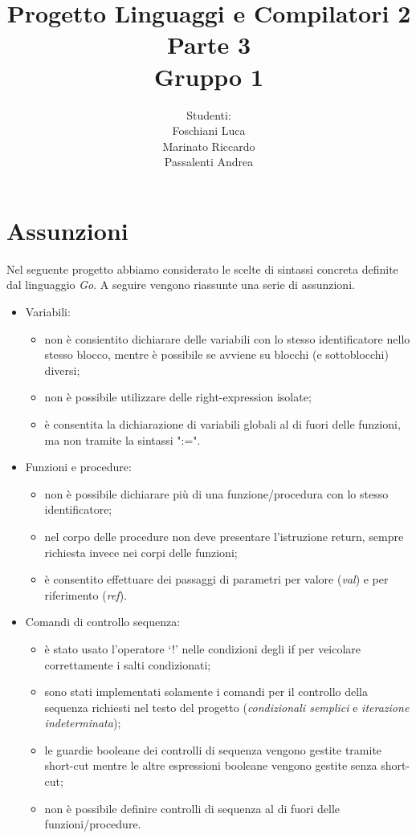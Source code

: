 \documentclass[12pt]{article}
\begin{document}
\title{\noindent \Huge Progetto Linguaggi e Compilatori 2\\ Parte 3 \\ Gruppo 1}
\date{}
\author{Studenti: \\Foschiani Luca\\ Marinato Riccardo \\Passalenti Andrea}

\maketitle
\newpage

\section{Assunzioni}
Nel seguente progetto abbiamo considerato le scelte di sintassi concreta definite dal linguaggio \textit{Go}.
A seguire vengono riassunte una serie di assunzioni.

\begin{itemize}
\item Variabili:
	\begin{itemize}
		\item non è consientito dichiarare delle variabili con lo stesso identificatore nello stesso blocco, mentre è possibile se avviene su blocchi (e sottoblocchi) diversi;
		\item non è possibile utilizzare delle right-expression isolate;
		\item è consentita la dichiarazione di variabili globali al di fuori delle funzioni, ma non tramite la sintassi ":=".
	\end{itemize}
\item Funzioni e procedure:
	\begin{itemize}
		\item non è possibile dichiarare più di una funzione/procedura con lo stesso identificatore;
		\item nel corpo delle procedure non deve presentare l'istruzione return, sempre richiesta invece nei corpi delle funzioni;
		\item è consentito effettuare dei passaggi di parametri per valore (\textit{val}) e per riferimento (\textit{ref}).
	\end{itemize}
\item Comandi di controllo sequenza:
	\begin{itemize}
		\item è stato usato l'operatore `!' nelle condizioni degli if per veicolare correttamente i salti condizionati;
		\item sono stati implementati solamente i comandi per il controllo della sequenza richiesti nel testo del progetto (\textit{condizionali semplici} e \textit{iterazione indeterminata});
		\item le guardie booleane dei controlli di sequenza vengono gestite tramite short-cut mentre le altre espressioni booleane vengono gestite senza short-cut;
		\item non è possibile definire controlli di sequenza al di fuori delle funzioni/procedure.
	\end{itemize}
\end{itemize}
\end{document}
